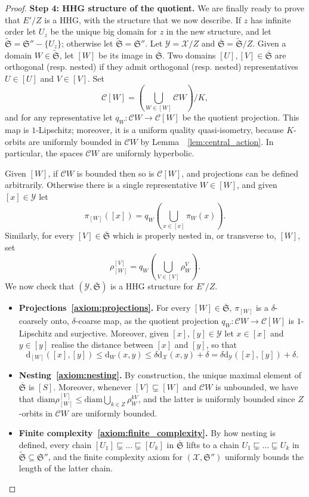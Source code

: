 \documentclass[svgnames]{amsart}
\theoremstyle{plain}
\theoremstyle{definition}
\newcommand{\cal}[1]{\mathcal{#1}}
\newcommand{\frakS}{\mathfrak{S}}
\newcommand{\C}{\cal C}
\newcommand{\diam}{\mathrm{diam}}
\newcommand{\dist}{\mathrm{d}}
\newcommand{\propnest}{\sqsubsetneq}
\newcommand{\ofS}{\overline{\frakS}}
\newcommand{\wfS}{\widetilde{\frakS}}
\begin{document}
\begin{proof}
    \par\medskip\textbf{Step 4: HHG structure of the quotient.} 
    We are finally ready to prove that $E'/Z$ is a HHG, with the structure that we now describe. If $z$ has infinite order let $U_z$ be the unique big domain for $z$ in the new structure, and let $\wfS=\frakS''-\{U_z\}$; otherwise let $\wfS=\frakS''$. Let $\cal Y=\cal X/Z$ and $\ofS=\wfS/Z$. Given a domain $W\in \wfS$, let $[W]$ be its image in $\ofS$. Two domains $[U], [V]\in \ofS$ are orthogonal (resp. nested) if they admit orthogonal (resp. nested) representatives $U\in [U]$ and $V\in [V]$. Set 
    $$\cal C [W]=\left(\bigcup_{W\in [W]}\cal C W\right)/K,$$ and for any representative let $q_W\colon \cal C W\to \cal C [W]$ be the quotient projection. This map is $1$-Lipschitz; moreover, it is a uniform quality quasi-isometry, because $K$-orbits are uniformly bounded in $\cal C W$ by Lemma~~\ref{lem:central_action}. In particular, the spaces $\cal CW$ are uniformly hyperbolic.
    
    Given $[W]$, if $\cal C W$ is bounded then so is $\cal C [W]$, and projections can be defined arbitrarily. Otherwise there is a single representative $W\in [W]$, and given $ [x]\in \cal Y$ let $$\pi_{[W]}([x])=q_W\left(\bigcup_{x\in [x]} \pi_W(x)\right).$$ Similarly, for every $[V]\in \ofS$ which is properly nested in, or transverse to, $[W]$, set 
    $$\rho^{[V]}_{[W]}=q_W\left(\bigcup_{V\in [V]} \rho^V_W\right).$$ 
    We now check that $(\cal Y, \ofS)$ is a HHG structure for $E'/Z$.
    \begin{itemize}
        \item \textbf{Projections~\ref{axiom:projections}.} For every $[W]\in \ofS$, $\pi_{[W]}$ is a $\delta$-coarsely onto, $\delta$-coarse map, as the quotient projection $q_W\colon \C W\to \C[W]$ is $1$-Lipschitz and surjective. Moreover, given $[x],[y]\in \cal Y$ let $x\in [x]$ and $y\in [y]$ realise the distance between $[x]$ and $[y]$, so that \[\dist_{[W]}([x],[y])\le \dist_{W}(x,y)\le \delta\dist_{\cal X}(x,y)+\delta=\delta\dist_{\cal Y}([x],[y])+\delta.\]
        
         \item \textbf{Nesting~\ref{axiom:nesting}.} By construction, the unique maximal element of $\ofS$ is $[S]$. Moreover, whenever $[V]\propnest [W]$ and $\cal C W$ is unbounded, we have that $\diam\rho^{[V]}_{[W]}\le \diam \bigcup_{k\in Z}\rho^{kV}_{W}$, and the latter is uniformly bounded since $Z$-orbits in $\cal C W$ are uniformly bounded.
        
        \item \textbf{Finite complexity~\ref{axiom:finite_complexity}.} By how nesting is defined, every chain $[U_1]\propnest\ldots\propnest [U_k]$ in $\ofS$ lifts to a chain $U_1\propnest \ldots\propnest U_k$ in $\wfS\subseteq \frakS''$, and the finite complexity axiom for $(\cal X, \frakS'')$ uniformly bounds the length of the latter chain.
        

\end{itemize}
\end{proof}
\end{document}
